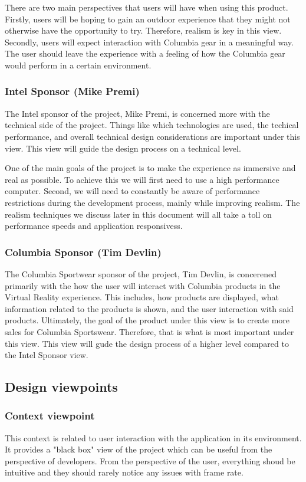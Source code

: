 \documentclass[10pt,journal,compsoc,onecolumn, draftclsnofoot]{IEEEtran}
\begin{document}
There are two main perspectives that users will have when using this product.
Firstly, users will be hoping to gain an outdoor experience that they might not otherwise have the opportunity to try. Therefore, realism is key in this view.
Secondly, users will expect interaction with Columbia gear in a meaningful way.
The user should leave the experience with a feeling of how the Columbia gear would perform in a certain environment.


\subsubsection{Intel Sponsor (Mike Premi)}
The Intel sponsor of the project, Mike Premi, is concerned more with the technical side of the project.
Things like which technologies are used, the techical performance, and overall technical design considerations are important under this view.
This view will guide the design process on a technical level.

One of the main goals of the project is to make the experience as immersive and real as possible. To achieve this we will first need to use a high performance computer. Second, we will need to constantly be aware of performance restrictions during the development process, mainly while improving realism. The realism techniques we discuss later in this document will all take a toll on performance speeds and application responsivess.

\subsubsection{Columbia Sponsor (Tim Devlin)}
The Columbia Sportwear sponsor of the project, Tim Devlin, is concerened primarily with the how the user will interact with Columbia products in the Virtual Reality experience.
This includes, how products are displayed, what information related to the products is shown, and the user interaction with said products.
Ultimately, the goal of the product under this view is to create more sales for Columbia Sportswear.
Therefore, that is what is most important under this view.
This view will gude the design process of a higher level compared to the Intel Sponsor view.

\subsection{Design viewpoints}
\subsubsection{Context viewpoint}
This context is related to user interaction with the application in its
environment. It provides a "black box" view of the project which can be useful
from the perspective of developers. From the perspective of the user,
everything shoud be intuitive and they should rarely notice any issues with
frame rate.\\
\end{document}
